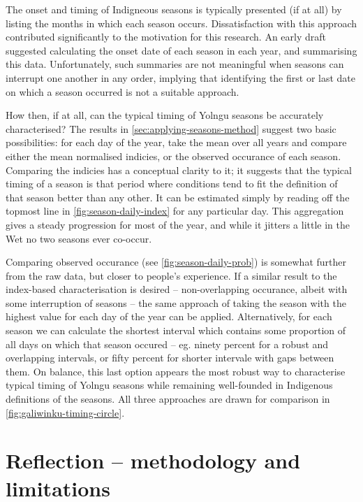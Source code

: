 The onset and timing of Indigneous seasons is typically presented (if at all)
by listing the months in which each season occurs.  Dissatisfaction with this
approach contributed significantly to the motivation for this research.
%
An early draft suggested calculating the onset date of each season in each
year, and summarising this data.  Unfortunately, such summaries are not
meaningful when seasons can interrupt one another in any order, implying
that identifying the first or last date on which a season occurred is not
a suitable approach.

How then, if at all, can the typical timing of Yolngu seasons be accurately
characterised?  The results in \cref{sec:applying-seasons-method} suggest two
basic possibilities: for each day of the year, take the mean over all years
and compare either the mean normalised indicies, or the observed occurance
of each season.
%
Comparing the indicies has a conceptual clarity to it; it suggests that the
typical timing of a season is that period where conditions tend to fit the
definition of that season better than any other.  It can be estimated simply
by reading off the topmost line in \cref{fig:season-daily-index} for any
particular day.  This aggregation gives a steady progression for most of the
year, and while it jitters a little in the Wet no two seasons ever co-occur.

Comparing observed occurance (see \cref{fig:season-daily-prob}) is somewhat
further from the raw data, but closer to people's experience.  If a similar
result to the index-based characterisation is desired -- non-overlapping
occurance, albeit with some interruption of seasons -- the same approach of taking the season
with the highest value for each day of the year can be applied.
%
Alternatively, for each season we can calculate the shortest interval which
contains some proportion of all days on which that season occured -- eg.
ninety percent for a robust and overlapping intervals, or fifty percent for
shorter intervale with gaps between them.  On balance, this last option
appears the most robust way to characterise typical timing of Yolngu seasons while
remaining well-founded in Indigenous definitions of the seasons.
%
All three approaches are drawn for comparison in \cref{fig:galiwinku-timing-circle}.



\section{Reflection -- methodology and limitations}
\label{sec:disc-reflection}

